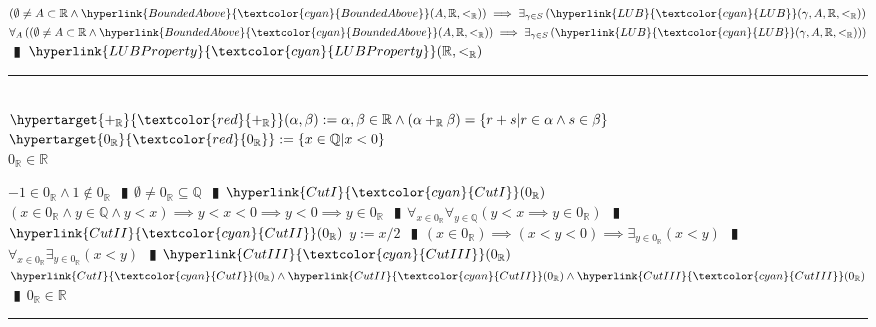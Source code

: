 \documentclass{book}
\newcommand{\df}[1]{\hypertarget{#1}{\textcolor{red}{#1}}}
\newcommand{\wff}[1]{\hypertarget{#1}{\fbox{\textcolor{red}{$#1$}}\phantom{--}}}
\newcommand{\rf}[1]{\hyperlink{#1}{\textcolor{cyan}{#1}}}
\newcommand{\abr}{:=}
\newcommand{\pipe}{$\phantom{(}\vrectangleblack\phantom{)}$}
\newcommand{\pr}[1]{\left(#1\right)}
\begin{document}
\begin{enumerate}
\begin{enumerate}
  \end{enumerate}  
  \lit $\pr{\emptyset \neq A \subset \mathbb{R} \land \rf{BoundedAbove}(A, \mathbb{R}, <_{\mathbb{R}})} \implies \exists_{\gamma \in S}\pr{\rf{LUB}(\gamma, A, \mathbb{R}, <_{\mathbb{R}})}$
  \lit $\forall_{A}\pr{\pr{\emptyset \neq A \subset \mathbb{R} \land \rf{BoundedAbove}(A, \mathbb{R}, <_{\mathbb{R}})} \implies \exists_{\gamma \in S}\pr{\rf{LUB}(\gamma, A, \mathbb{R}, <_{\mathbb{R}})}}$ \pipe $\rf{LUBProperty}(\mathbb{R}, <_{\mathbb{R}})$
\end{enumerate} \vspace{.75mm} \hrule \vspace{.75mm} \ \\

$\df{+_{\mathbb{R}}}(\alpha, \beta) \abr \alpha, \beta \in \mathbb{R} \land (\alpha +_{\mathbb{R}} \beta) = \{r + s | r \in \alpha \land s \in \beta\}$ \\
$\df{0_{\mathbb{R}}} \abr \{x \in \mathbb{Q} | x < 0\}$ \\

\wff{0InR} $0_{\mathbb{R}} \in \mathbb{R}$
\begin{enumerate}
  \lit $-1 \in 0_{\mathbb{R}} \land 1 \notin 0_{\mathbb{R}}$ \pipe $\emptyset \neq 0_{\mathbb{R}} \subseteq \mathbb{Q}$ \pipe $\rf{CutI}(0_{\mathbb{R}})$
  \lit $(x \in 0_{\mathbb{R}} \land y \in \mathbb{Q} \land y < x) \implies y < x < 0 \implies y < 0 \implies y \in 0_{\mathbb{R}}$ \pipe $\forall_{x \in 0_{\mathbb{R}}} \forall_{y \in \mathbb{Q}} (y < x \implies y \in 0_{\mathbb{R}})$ \pipe $\rf{CutII}(0_{\mathbb{R}})$
  \lit $y \abr x / 2$ \pipe $(x \in 0_{\mathbb{R}}) \implies (x < y < 0) \implies \exists_{y \in 0_{\mathbb{R}}}(x < y)$ \pipe $\forall_{x \in 0_{\mathbb{R}}} \exists_{y \in 0_{\mathbb{R}}}(x < y)$ \pipe $\rf{CutIII}(0_{\mathbb{R}})$
  \lit $\rf{CutI}(0_{\mathbb{R}}) \land \rf{CutII}(0_{\mathbb{R}}) \land \rf{CutIII}(0_{\mathbb{R}})$ \pipe $0_{\mathbb{R}} \in \mathbb{R}$
\end{enumerate} \vspace{.75mm} \hrule \vspace{.75mm} \ \\
\end{document}
